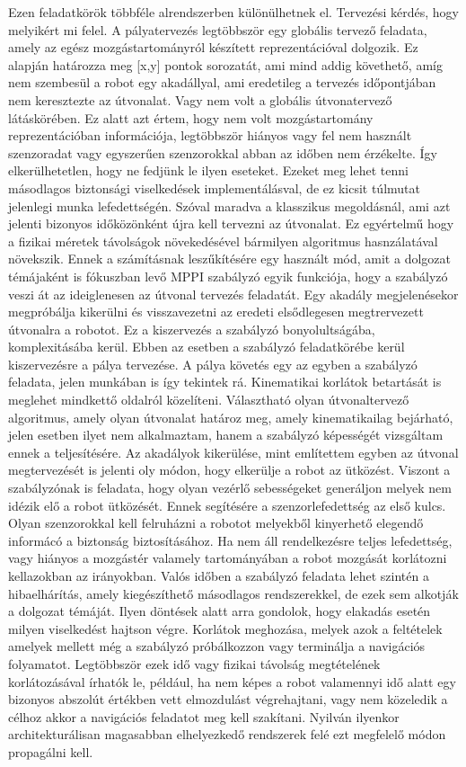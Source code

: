 Ezen feladatkörök többféle alrendszerben különülhetnek el. Tervezési kérdés, hogy melyikért mi felel. A pályatervezés legtöbbször egy globális tervező feladata, amely az egész mozgástartományról készített reprezentációval dolgozik. Ez alapján határozza meg [x,y] pontok sorozatát, ami mind addig követhető, amíg nem szembesül a robot egy akadállyal, ami eredetileg a tervezés időpontjában nem keresztezte az útvonalat. Vagy nem volt a globális útvonatervező látáskörében. Ez alatt azt értem, hogy nem volt mozgástartomány reprezentációban információja, legtöbbször hiányos vagy fel nem használt szenzoradat vagy egyszerűen szenzorokkal abban az időben nem érzékelte. Így elkerülhetetlen, hogy ne fedjünk le ilyen eseteket. Ezeket meg lehet tenni másodlagos biztonsági viselkedések implementálásval, de ez kicsit túlmutat jelenlegi munka lefedettségén. Szóval maradva a klasszikus megoldásnál, ami azt jelenti bizonyos időközönként újra kell tervezni az útvonalat. Ez egyértelmű hogy a fizikai méretek távolságok növekedésével bármilyen algoritmus hasnzálatával növekszik. Ennek a számításnak leszűkítésére egy használt mód, amit a dolgozat témájaként is fókuszban levő MPPI szabályzó egyik funkciója, hogy a szabályzó veszi át az ideiglenesen az útvonal tervezés feladatát. Egy akadály megjelenésekor megpróbálja kikerülni és visszavezetni az eredeti elsődlegesen megtrervezett útvonalra a robotot. Ez a kiszervezés a szabályzó bonyolultságába, komplexitásába kerül. Ebben az esetben a szabályzó feladatkörébe kerül kiszervezésre a pálya tervezése. A pálya követés egy az egyben a szabályzó feladata, jelen munkában is így tekintek rá. Kinematikai korlátok betartását is meglehet mindkettő oldalról közelíteni. Választható olyan útvonaltervező algoritmus, amely olyan útvonalat határoz meg, amely kinematikailag bejárható, jelen esetben ilyet nem alkalmaztam, hanem a szabályzó képességét vizsgáltam ennek a teljesítésére. Az akadályok kikerülése, mint említettem egyben az útvonal megtervezését is jelenti oly módon, hogy elkerülje a robot az ütközést. Viszont a szabályzónak is feladata, hogy olyan vezérlő sebességeket generáljon melyek nem idézik elő a robot ütközését. Ennek segítésére a szenzorlefedettség az első kulcs. Olyan szenzorokkal kell felruházni a robotot melyekből kinyerhető elegendő informácó a biztonság biztosításához. Ha nem áll rendelkezésre teljes lefedettség, vagy hiányos a mozgástér valamely tartományában a robot mozgását korlátozni kellazokban az irányokban. Valós időben a szabályzó feladata lehet szintén a hibaelhárítás, amely kiegészíthető másodlagos rendszerekkel, de ezek sem alkotják a dolgozat témáját. Ilyen döntések alatt arra gondolok, hogy elakadás esetén milyen viselkedést hajtson végre. Korlátok meghozása, melyek azok a feltételek amelyek mellett még a szabályzó próbálkozzon vagy terminálja a navigációs folyamatot. Legtöbbször ezek idő vagy fizikai távolság megtételének korlátozásával írhatók le, például, ha nem képes a robot valamennyi idő alatt egy bizonyos abszolút értékben vett elmozdulást végrehajtani, vagy nem közeledik a célhoz akkor a navigációs feladatot meg kell szakítani. Nyilván ilyenkor architekturálisan magasabban elhelyezkedő rendszerek felé ezt megfelelő módon propagálni kell.

